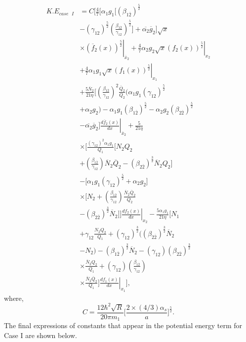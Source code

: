 \documentclass[preprint,12pt]{elsarticle}
\begin{document}
 \begin{equation}
 \begin{split}
 K.E_{case\text{ }I} &= C \biggl[\frac{4}{7} \biggl[\alpha_1g_1\biggl[(\beta_{1\overline{2}})^\frac{5}{2}  \\ & - (\gamma_{12})^\frac{5}{2} \left(\frac{\beta_{1\overline{2}}}{\gamma_{12}}\right)^\frac{5}{2} \biggr] + \overline{\alpha_2}\overline{g}_{2}\biggr]  \sqrt{x} \\ &  \times \left. (\overline{f}_{2}(x))^\frac{5}{2} \right|_{\overline{x}_{2}} + \left. \frac{4}{7} \alpha_2g_2  \sqrt{x} (f_2(x))^\frac{5}{2} \right|_{x_2} \\ &  +\left. \frac{4}{7} \alpha_1g_1 \sqrt{x} (f_1(x))^\frac{5}{2}\right|_{x_1}  \\ &  + \frac{5\overline{N}_{2}}{21\eta} \biggl[\left(\frac{\beta_{1\overline{2}}}{\gamma_{12}}\right)^2   \frac{\overline{Q}_{2}}{Q_2}\biggl(\alpha_1g_1(\gamma_{12})^\frac{5}{2} \\ & + \alpha_2g_2\biggr) - \alpha_1g_1 (\beta_{1\overline{2}})^\frac{5}{2}   -\alpha_2g_2 (\beta_{2\overline{2}})^\frac{5}{2}  \\ & - \overline{\alpha_2}\overline{g}_{2} \left. \biggr]\frac{d\overline{f}_{2}(x)}{dx}\right|_{\overline{x}_{2}} + \frac{5}{21\eta} \\ & \times \biggl[\frac{(\gamma_{12})^2 \alpha_{1}g_{1}}{Q_1} \biggl[N_2Q_2  \\ & +\left(\frac{\beta_{1\overline{2}}}{\gamma_{12}}\right)\overline{N}_{2}\overline{Q}_{2}  - (\beta_{2\overline{2}})^\frac{3}{2} \overline{N}_{2}Q_2\biggr] \\ &-\biggl[\alpha_1g_1(\gamma_{12})^\frac{5}{2} + \alpha_2g_2\biggr]\\ & \times \biggl[N_2+\left(\frac{\beta_{1\overline{2}}}{\gamma_{12}}\right)\frac{\overline{N}_{2}\overline{Q}_{2}}{Q_2} \\ & - (\beta_{2\overline{2}})^\frac{3}{2}\overline{N}_{2}\biggr]\left.\biggr]  \frac{df_2(x)}{dx}\right|_{x_2}  - \frac{5\alpha_1g_1}{21\eta}\biggl[ N_1 \\ & + \gamma_{12}\frac{N_2Q_2}{Q_1}    + (\gamma_{12})^\frac{3}{2}  \biggl((\beta_{2\overline{2}})^\frac{3}{2}\overline{N}_{2}  \\ & - N_2\biggr)- (\beta_{1\overline{2}})^\frac{3}{2}\overline{N}_{2}   - (\gamma_{12})(\beta_{2\overline{2}})^\frac{3}{2}\\ & \times \frac{\overline{N}_{2}Q_2}{Q_1}  + (\gamma_{12})\left(\frac{\beta_{1\overline{2}}}{\gamma_{12}}\right) \\ &  \times \frac{\overline{N}_{2}\overline{Q}_{2}}{Q_1}\left. \biggr]\frac{df_1(x)}{dx} \right|_{x_1}\biggr],           
  \label{eqn:kinetic_energy_caseI}
  \end{split}
  \end{equation}
            where,
         \begin{equation}
            C = \frac{12\hbar^2\sqrt{R}}{20 \pi m_1}\biggl[\frac{2\times(4/3)\alpha_s}{a}\biggr]^\frac{5}{2}.
            \label{eqn:expression_of_C}
        \end{equation}    
            The final expressions of constants that appear in the potential energy term for Case I are shown below. \\ 
       
\end{document}

